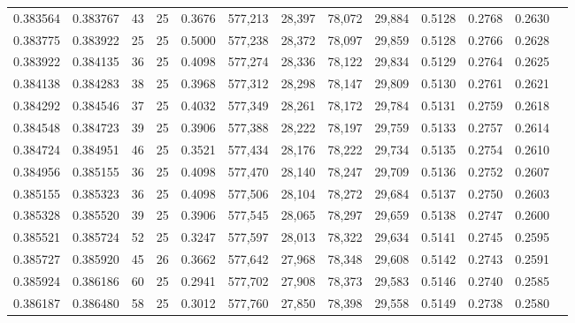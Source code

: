 \begin{tabular}{rrrrrrrrrrrrr}
0.383564 & 0.383767 &    43 &  25 &                                     0.3676 & 577,213 &  28,397 &  78,072 &  29,884 & 0.5128 & 0.2768 & 0.2630 \\
0.383775 & 0.383922 &    25 &  25 &                                     0.5000 & 577,238 &  28,372 &  78,097 &  29,859 & 0.5128 & 0.2766 & 0.2628 \\
0.383922 & 0.384135 &    36 &  25 &                                     0.4098 & 577,274 &  28,336 &  78,122 &  29,834 & 0.5129 & 0.2764 & 0.2625 \\
0.384138 & 0.384283 &    38 &  25 &                                     0.3968 & 577,312 &  28,298 &  78,147 &  29,809 & 0.5130 & 0.2761 & 0.2621 \\
0.384292 & 0.384546 &    37 &  25 &                                     0.4032 & 577,349 &  28,261 &  78,172 &  29,784 & 0.5131 & 0.2759 & 0.2618 \\
0.384548 & 0.384723 &    39 &  25 &                                     0.3906 & 577,388 &  28,222 &  78,197 &  29,759 & 0.5133 & 0.2757 & 0.2614 \\
0.384724 & 0.384951 &    46 &  25 &                                     0.3521 & 577,434 &  28,176 &  78,222 &  29,734 & 0.5135 & 0.2754 & 0.2610 \\
0.384956 & 0.385155 &    36 &  25 &                                     0.4098 & 577,470 &  28,140 &  78,247 &  29,709 & 0.5136 & 0.2752 & 0.2607 \\
0.385155 & 0.385323 &    36 &  25 &                                     0.4098 & 577,506 &  28,104 &  78,272 &  29,684 & 0.5137 & 0.2750 & 0.2603 \\
0.385328 & 0.385520 &    39 &  25 &                                     0.3906 & 577,545 &  28,065 &  78,297 &  29,659 & 0.5138 & 0.2747 & 0.2600 \\
0.385521 & 0.385724 &    52 &  25 &                                     0.3247 & 577,597 &  28,013 &  78,322 &  29,634 & 0.5141 & 0.2745 & 0.2595 \\
0.385727 & 0.385920 &    45 &  26 &                                     0.3662 & 577,642 &  27,968 &  78,348 &  29,608 & 0.5142 & 0.2743 & 0.2591 \\
0.385924 & 0.386186 &    60 &  25 &                                     0.2941 & 577,702 &  27,908 &  78,373 &  29,583 & 0.5146 & 0.2740 & 0.2585 \\
0.386187 & 0.386480 &    58 &  25 &                                     0.3012 & 577,760 &  27,850 &  78,398 &  29,558 & 0.5149 & 0.2738 & 0.2580 \\

\end{tabular}
